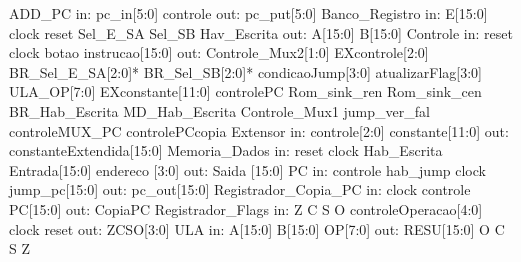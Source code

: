 ADD_PC
    in:
        pc_in[5:0]
        controle
    out:
        pc_put[5:0]
Banco_Registro
    in:
        E[15:0]
        clock
        reset
        Sel_E_SA
        Sel_SB
        Hav_Escrita
    out:
        A[15:0]
        B[15:0]
Controle
    in:
        reset
        clock
        botao
        instrucao[15:0]
    out:
        Controle_Mux2[1:0]
        EXcontrole[2:0]
        BR_Sel_E_SA[2:0]*
        BR_Sel_SB[2:0]*
        condicaoJump[3:0]
        atualizarFlag[3:0]
        ULA_OP[7:0]
        EXconstante[11:0]
        controlePC
        Rom_sink_ren
        Rom_sink_cen
        BR_Hab_Escrita
        MD_Hab_Escrita
        Controle_Mux1
        jump_ver_fal
        controleMUX_PC
        controlePCcopia
Extensor
    in:
        controle[2:0]
        constante[11:0]
    out:
        constanteExtendida[15:0]
Memoria_Dados
    in:
        reset
        clock
        Hab_Escrita
        Entrada[15:0]
        endereco [3:0]
    out:
        Saida [15:0]
PC
    in:
        controle
        hab_jump
        clock
        jump_pc[15:0]
    out:
        pc_out[15:0]
Registrador_Copia_PC
    in:
        clock
        controle
        PC[15:0]
    out:
        CopiaPC
Registrador_Flags
    in:
        Z
        C
        S
        O
        controleOperacao[4:0]
        clock
        reset
    out:
        ZCSO[3:0]
ULA
    in:
        A[15:0]
        B[15:0]
        OP[7:0]
    out:
        RESU[15:0]
        O
        C
        S
        Z
